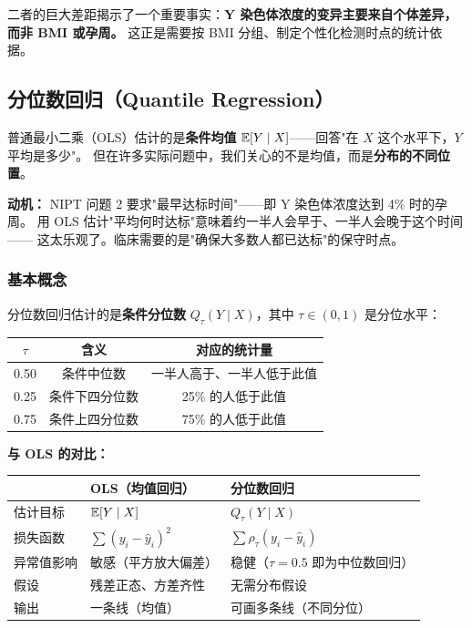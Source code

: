 二者的巨大差距揭示了一个重要事实：\textbf{Y 染色体浓度的变异主要来自个体差异，而非 BMI 或孕周。}
这正是需要按 BMI 分组、制定个性化检测时点的统计依据。

\subsection{分位数回归（Quantile Regression）}

普通最小二乘（OLS）估计的是\textbf{条件均值} $\mathbb{E}[Y \mid X]$——回答"在 $X$ 这个水平下，$Y$ 平均是多少"。
但在许多实际问题中，我们关心的不是均值，而是\textbf{分布的不同位置}。

\medskip
\textbf{动机：} NIPT 问题 2 要求"最早达标时间"——即 Y 染色体浓度达到 4\% 时的孕周。
用 OLS 估计"平均何时达标"意味着约一半人会早于、一半人会晚于这个时间——
这太乐观了。临床需要的是"确保大多数人都已达标"的保守时点。

\subsubsection{基本概念}

分位数回归估计的是\textbf{条件分位数} $Q_\tau(Y \mid X)$，其中 $\tau \in (0,1)$ 是分位水平：

\begin{center}
\renewcommand{\arraystretch}{1.3}
\begin{tabular}{c|c|c}
\toprule
$\tau$ & 含义 & 对应的统计量 \\
\midrule
0.50 & 条件中位数 & 一半人高于、一半人低于此值 \\
0.25 & 条件下四分位数 & 25\% 的人低于此值 \\
0.75 & 条件上四分位数 & 75\% 的人低于此值 \\
\bottomrule
\end{tabular}
\end{center}

\textbf{与 OLS 的对比：}

\begin{center}
\renewcommand{\arraystretch}{1.4}
\begin{tabular}{p{3cm}|p{4.5cm}|p{4.5cm}}
\toprule
& \textbf{OLS（均值回归）} & \textbf{分位数回归} \\
\midrule
估计目标 & $\mathbb{E}[Y \mid X]$ & $Q_\tau(Y \mid X)$ \\
损失函数 & $\sum (y_i - \hat{y}_i)^2$ & $\sum \rho_\tau(y_i - \hat{y}_i)$ \\
异常值影响 & 敏感（平方放大偏差） & 稳健（$\tau=0.5$ 即为中位数回归） \\
假设 & 残差正态、方差齐性 & 无需分布假设 \\
输出 & 一条线（均值） & 可画多条线（不同分位） \\
\bottomrule
\end{tabular}
\end{center}

